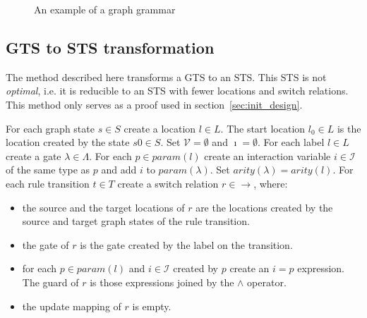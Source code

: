 \begin{figure}[ht]
  \begin{center}
    \hspace{20px}
    \hspace{20px}
    \hspace{20px}
    
    \hspace{20px}
    \hspace{20px}
  \end{center}
  \caption{An example of a graph grammar}
  \label{fig:gts}
\end{figure}

\subsection{GTS to STS transformation}\label{sec:gts_sts_trafo}
The method described here transforms a GTS to an STS. This STS is not \textit{optimal}, i.e. it is reducible to an STS with fewer locations and switch relations. This method only serves as a proof used in section~\ref{sec:init_design}.

For each graph state $s \in S$ create a location $l \in L$. The start location $l_0 \in L$ is the location created by the state $s0 \in S$. Set $\mathcal{V} = \emptyset$ and $\imath = \emptyset$. For each label $l \in L$ create a gate $\lambda \in \Lambda$. For each $p \in \mathit{param}(l)$ create an interaction variable $i \in \mathcal{I}$ of the same type as $p$ and add $i$ to $param(\lambda)$. Set $\mathit{arity}(\lambda) = \mathit{arity}(l)$. For each rule transition $t \in T$ create a switch relation $r \in \rightarrow$, where:
\begin{itemize}
  \item the source and the target locations of $r$ are the locations created by the source and target graph states of the rule transition.
  \item the gate of $r$ is the gate created by the label on the transition.
  \item for each $p \in \mathit{param}(l)$ and $i \in \mathcal{I}$ created by $p$ create an $i = p$ expression. The guard of $r$ is those expressions joined by the $\land$ operator.
  \item the update mapping of $r$ is empty.
\end{itemize}

